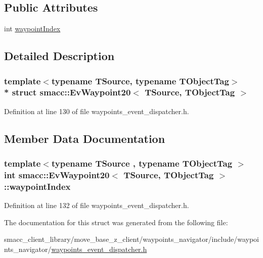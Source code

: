 \subsection*{Public Attributes}
\begin{DoxyCompactItemize}
\item 
int \hyperlink{structsmacc_1_1EvWaypoint20_a21ab6d4f5d7a6f0624d53352ae166474}{waypoint\+Index}
\end{DoxyCompactItemize}


\subsection{Detailed Description}
\subsubsection*{template$<$typename T\+Source, typename T\+Object\+Tag$>$\\*
struct smacc\+::\+Ev\+Waypoint20$<$ T\+Source, T\+Object\+Tag $>$}



Definition at line 130 of file waypoints\+\_\+event\+\_\+dispatcher.\+h.



\subsection{Member Data Documentation}
\subsubsection[{\texorpdfstring{waypoint\+Index}{waypointIndex}}]{\setlength{\rightskip}{0pt plus 5cm}template$<$typename T\+Source , typename T\+Object\+Tag $>$ int {\bf smacc\+::\+Ev\+Waypoint20}$<$ T\+Source, T\+Object\+Tag $>$\+::waypoint\+Index}\hypertarget{structsmacc_1_1EvWaypoint20_a21ab6d4f5d7a6f0624d53352ae166474}{}\label{structsmacc_1_1EvWaypoint20_a21ab6d4f5d7a6f0624d53352ae166474}


Definition at line 132 of file waypoints\+\_\+event\+\_\+dispatcher.\+h.



The documentation for this struct was generated from the following file\+:\begin{DoxyCompactItemize}
\item 
smacc\+\_\+client\+\_\+library/move\+\_\+base\+\_\+z\+\_\+client/waypoints\+\_\+navigator/include/waypoints\+\_\+navigator/\hyperlink{waypoints__event__dispatcher_8h}{waypoints\+\_\+event\+\_\+dispatcher.\+h}\end{DoxyCompactItemize}
